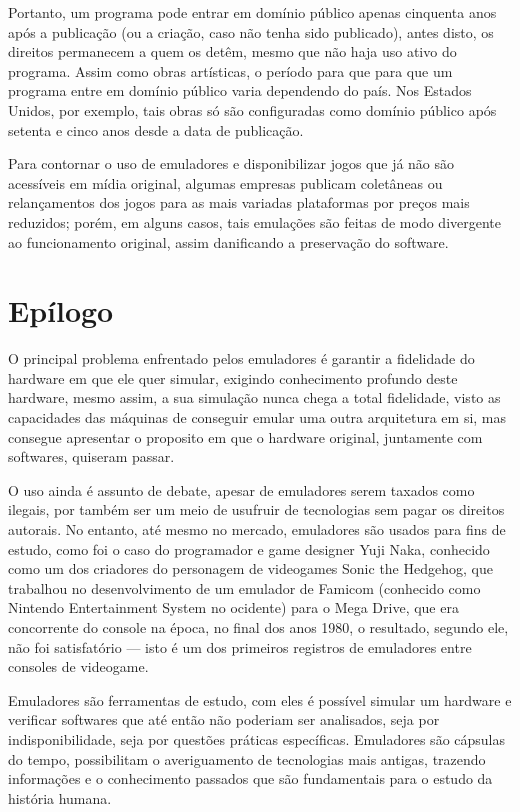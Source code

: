 \documentclass[12pt]{sftex/sftex}
\begin{document}
Portanto, um programa pode entrar em domínio público apenas cinquenta anos após
a publicação (ou a criação, caso não tenha sido publicado), antes disto, os
direitos permanecem a quem os detêm, mesmo que não haja uso ativo do programa.
Assim como obras artísticas, o período para que para que um programa entre em
domínio público varia dependendo do país. Nos Estados Unidos, por exemplo, tais
obras só são configuradas como domínio público após setenta e cinco anos desde a
data de publicação.

Para contornar o uso de emuladores e disponibilizar jogos que já não são
acessíveis em mídia original, algumas empresas publicam coletâneas ou
relançamentos dos jogos para as mais variadas plataformas por preços mais
reduzidos; porém, em alguns casos, tais emulações são feitas de modo divergente
ao funcionamento original, assim danificando a preservação do software.

\section{Epílogo}
O principal problema enfrentado pelos emuladores é garantir a fidelidade do
hardware em que ele quer simular, exigindo conhecimento profundo deste
hardware, mesmo assim, a sua simulação nunca chega a total fidelidade, visto as
capacidades das máquinas de conseguir emular uma outra arquitetura em si, mas
consegue apresentar o proposito em que o hardware original, juntamente com
softwares, quiseram passar.

O uso ainda é assunto de debate, apesar de emuladores serem taxados como
ilegais, por também ser um meio de usufruir de tecnologias sem pagar os
direitos autorais.  No entanto, até mesmo no mercado, emuladores são usados
para fins de estudo, como foi o caso do programador e game designer Yuji Naka,
conhecido como um dos criadores do personagem de videogames Sonic the Hedgehog,
que trabalhou no desenvolvimento de um emulador de Famicom (conhecido como
Nintendo Entertainment System no ocidente) para o Mega Drive, que era
concorrente do console na época, no final dos anos 1980, o resultado, segundo
ele, não foi satisfatório --- isto é um dos primeiros registros de emuladores
entre consoles de videogame.

Emuladores são ferramentas de estudo, com eles é possível simular um hardware e
verificar softwares que até então não poderiam ser analisados, seja por
indisponibilidade, seja por questões práticas específicas. Emuladores são
cápsulas do tempo, possibilitam o averiguamento de tecnologias mais antigas,
trazendo informações e o conhecimento passados que são fundamentais para o
estudo da história humana.



\end{document}
